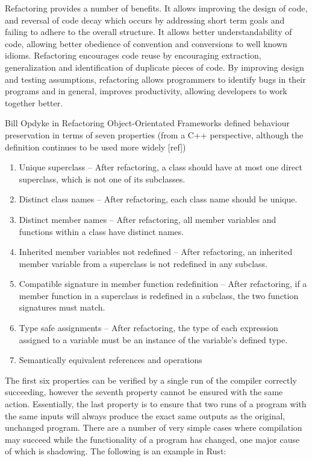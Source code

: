 Refactoring provides a number of benefits. It allows improving the design of code, and reversal of code decay which occurs by addressing short term goals and failing to adhere to the overall structure. It allows better understandability of code, allowing better obedience of convention and conversions to well known idioms. Refactoring encourages code reuse by encouraging extraction, generalization and identification of duplicate pieces of code. By improving design and testing assumptions, refactoring allows programmers to identify bugs in their programs and in general, improves productivity, allowing developers to work together better.

Bill Opdyke in Refactoring Object-Orientated Frameworks defined behaviour preservation in terms of seven properties (from a C++ perspective, although the definition continues to be used more widely [ref])
\begin{enumerate}
\item Unique superclass -- After refactoring, a class should have at most one direct superclass, which is not one of its subclasses.
\item Distinct class names -- After refactoring, each class name should be unique.
\item Distinct member names --  After refactoring, all member variables and functions within a class have distinct names.
\item Inherited member variables not redefined -- After refactoring, an inherited member variable from a superclass is not redefined in any subclass.
\item Compatible signature in member function redefinition -- After refactoring, if a member function in a superclass is redefined in a subclass, the two function signatures must match.
\item Type safe assignments -- After refactoring, the type of each expression assigned to a variable must be an instance of the variable's defined type.
\item Semantically equivalent references and operations
\end{enumerate}

The first six properties can be verified by a single run of the compiler correctly succeeding, however the seventh property cannot be ensured with the same action. Essentially, the last property is to ensure that two runs of a program with the same inputs will always produce the exact same outputs as the original, unchanged program. There are a number of very simple cases where compilation may succeed while the functionality of a program has changed, one major cause of which is shadowing. The following is an example in Rust:

